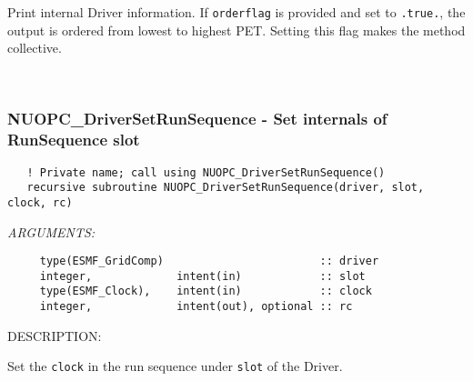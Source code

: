    Print internal Driver information. If {\tt orderflag} is provided and set
   to {\tt .true.}, the output is ordered from lowest to highest PET. Setting 
   this flag makes the method collective. 
 
\mbox{}\hrulefill\ 
 
\subsubsection [NUOPC\_DriverSetRunSequence] {NUOPC\_DriverSetRunSequence - Set internals of RunSequence slot}


  
\begin{verbatim}   ! Private name; call using NUOPC_DriverSetRunSequence()
   recursive subroutine NUOPC_DriverSetRunSequence(driver, slot, clock, rc)\end{verbatim}{\em ARGUMENTS:}
\begin{verbatim}     type(ESMF_GridComp)                        :: driver
     integer,             intent(in)            :: slot
     type(ESMF_Clock),    intent(in)            :: clock
     integer,             intent(out), optional :: rc \end{verbatim}
{\sf DESCRIPTION:\\ }


   Set the {\tt clock} in the run sequence under {\tt slot} of the Driver.
\setlength{\parskip}{\oldparskip}
\setlength{\parindent}{\oldparindent}
\setlength{\baselineskip}{\oldbaselineskip}

